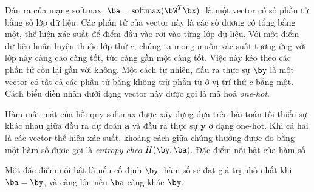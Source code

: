 \def\softmax{\text{softmax}}
Đầu ra của mạng softmax, $\ba = \softmax(\bW^T\bx)$, là một vector có số phần tử bằng số lớp dữ liệu. Các phần tử của vector này là các số dương có tổng bằng một, thể hiện xác suất để điểm đầu vào rơi vào từng lớp dữ liệu. Với một điểm dữ liệu huấn luyện thuộc lớp thứ $c$, chúng ta mong muốn xác suất tương ứng với lớp này càng cao càng tốt, tức càng gần một càng tốt. Việc này kéo theo các phần tử còn lại gần với không. Một cách tự nhiên, đầu ra thực sự $\by$ là một vector có tất cả các phần tử bằng không trừ phần từ ở vị trí thứ $c$ bằng một. Cách biểu diễn nhãn dưới dạng vector này được gọi là mã hoá \textit{one-hot}. 


Hàm mất mát của hồi quy softmax được xây dựng dựa trên bài toán tối thiểu sự
khác nhau giữa {đầu ra dự đoán} $\mathbf{a}$ và {đầu ra thực sự}
$\mathbf{y}$ ở dạng one-hot. Khi cả hai là các vector thể hiện xác suất,
khoảng cách giữa chúng thường được đo bằng một hàm số được gọi là
\textit{entropy chéo} $H(\by, \ba)$. Đặc điểm nổi bật của hàm số 

Một đặc điểm nổi bật là nếu cố định $\by$, hàm số sẽ đạt giá trị nhỏ nhất khi $\ba = \by$, và càng lớn nếu $\ba$ càng khác $\by$.


 
